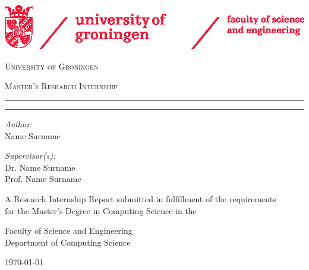 \begin{titlepage}
    \centering
    \large
    
    \includegraphics[width=1\textwidth]{figs/rugr_fse_logoen_rood_cmyk.eps}
    
    \vspace{1cm}
    
    {\Large\textsc{University of Groningen}}
    
    \vspace{1cm}

    \textsc{Master's Research Internship}
    
    \vspace{1cm}

    \par\noindent\rule{\textwidth}{2pt}
    
    \vspace{0.5cm}
    
    {\Huge \textbf{\theprojecttitle}}
    
    \vspace{0.5cm}
    
    \par\noindent\rule{\textwidth}{2pt}
    
    \vspace{1cm}

    \noindent
    \begin{minipage}[t]{.5\textwidth}
    \raggedright
    \textit{Author:}\\
    Name Surname
    \end{minipage}%
    \begin{minipage}[t]{.5\textwidth}
    \raggedleft
    \textit{Supervisor(s):} \\
    Dr. Name Surname\\
    Prof. Name Surname
    \end{minipage}

    \vspace{1.5cm}

    A
    Research Internship
    Report submitted in fulfillment of the requirements\\
    for the Master’s Degree in Computing Science
    in the
    
    Faculty of Science and Engineering\\
    Department of Computing Science

    \vfill
    
    \today

\end{titlepage}

\newpage